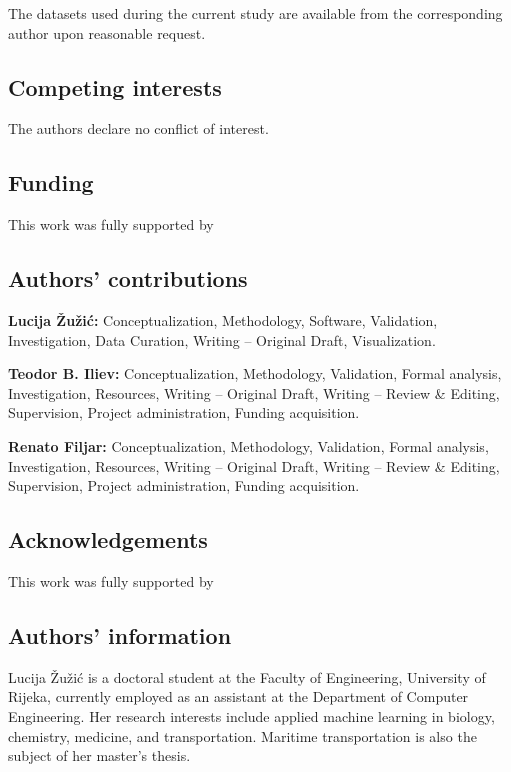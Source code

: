 \documentclass[sn-mathphys-num]{sn-jnl}%
\begin{document}
The datasets used during the current study are available from the corresponding author upon reasonable request.

\subsection{Competing interests}

The authors declare no conflict of interest.

\subsection{Funding}

This work was fully supported by

\subsection{Authors' contributions}

\textbf{Lucija Žužić:} Conceptualization, Methodology, Software, Validation, Investigation, Data Curation, Writing -- Original Draft, Visualization.

\textbf{Teodor B. Iliev:} Conceptualization, Methodology, Validation, Formal analysis, Investigation, Resources, Writing -- Original Draft, Writing -- Review \& Editing, Supervision, Project administration, Funding acquisition.

\textbf{Renato Filjar:} Conceptualization, Methodology, Validation, Formal analysis, Investigation, Resources, Writing -- Original Draft, Writing -- Review \& Editing, Supervision, Project administration, Funding acquisition.

\subsection{Acknowledgements}

This work was fully supported by

\subsection{Authors' information}

Lucija Žužić is a doctoral student at the Faculty of Engineering, University of Rijeka, currently employed as an assistant at the Department of Computer Engineering. Her research interests include applied machine learning in biology, chemistry, medicine, and transportation. Maritime transportation is also the subject of her master's thesis.
\end{document}

